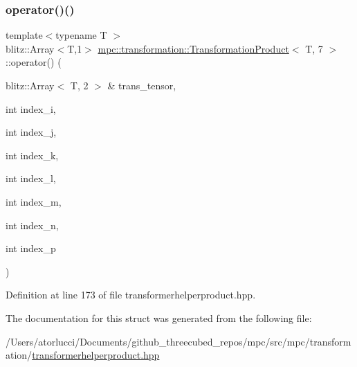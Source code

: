 \subsubsection{\texorpdfstring{operator()()}{operator()()}}
{\footnotesize\ttfamily template$<$typename T $>$ \\
blitz\+::\+Array$<$T,1$>$ \mbox{\hyperlink{structmpc_1_1transformation_1_1_transformation_product}{mpc\+::transformation\+::\+Transformation\+Product}}$<$ T, 7 $>$\+::operator() (\begin{DoxyParamCaption}\item[{blitz\+::\+Array$<$ T, 2 $>$ \&}]{trans\+\_\+tensor,  }\item[{int}]{index\+\_\+i,  }\item[{int}]{index\+\_\+j,  }\item[{int}]{index\+\_\+k,  }\item[{int}]{index\+\_\+l,  }\item[{int}]{index\+\_\+m,  }\item[{int}]{index\+\_\+n,  }\item[{int}]{index\+\_\+p }\end{DoxyParamCaption})\hspace{0.3cm}{\ttfamily [inline]}}



Definition at line 173 of file transformerhelperproduct.\+hpp.



The documentation for this struct was generated from the following file\+:\begin{DoxyCompactItemize}
\item 
/\+Users/atorlucci/\+Documents/github\+\_\+threecubed\+\_\+repos/mpc/src/mpc/transformation/\mbox{\hyperlink{transformerhelperproduct_8hpp}{transformerhelperproduct.\+hpp}}\end{DoxyCompactItemize}

